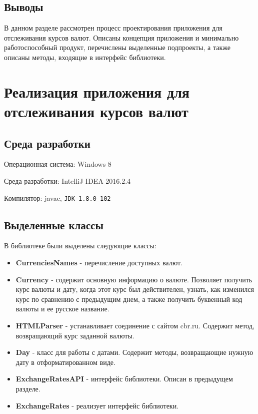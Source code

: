 \documentclass[a4paper]{article}
\begin{document}
\subsection{Выводы}

В данном разделе рассмотрен процесс проектирования приложения для отслеживания курсов валют. Описаны концепция приложения и минимально работоспособный продукт, перечислены выделенные подпроекты, а также описаны методы, входящие в интерфейс библиотеки. 

\section{Реализация приложения для отслеживания курсов валют}

\subsection{Среда разработки}

Операционная система: Windows 8

Среда разработки: IntelliJ IDEA 2016.2.4

Компилятор: javac, \verb|JDK 1.8.0_102|

\subsection{Выделенные классы}

В библиотеке были выделены следующие классы:
\begin{itemize}

\item \textbf{CurrenciesNames}  - перечисление доступных валют.

\item \textbf{Currency} - содержит основную информацию о валюте. Позволяет получить курс валюты и дату, когда этот курс был действителен, узнать, как изменился курс по сравнению с предыдущим днем, а также получить буквенный код валюты и ее русское название.

\item \textbf{HTMLParser} - устанавливает соединение с сайтом cbr.ru. Содержит метод, возвращающий курс заданной валюты. 


\item \textbf{Day} - класс для работы с датами. Содержит методы, возвращающие нужную дату в отформатированном виде.

\item \textbf{ExchangeRatesAPI} - интерфейс библиотеки. Описан в предыдущем разделе.

\item \textbf{ExchangeRates} - реализует интерфейс библиотеки. 

\end{itemize}
\end{document}
